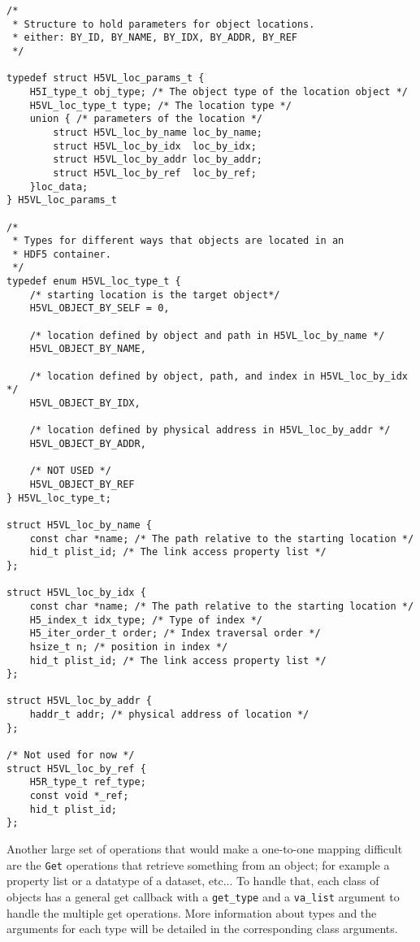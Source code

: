 \documentclass[10pt,a4paper]{article}
\begin{document}
\begin{lstlisting}
/* 
 * Structure to hold parameters for object locations.
 * either: BY_ID, BY_NAME, BY_IDX, BY_ADDR, BY_REF 
 */

typedef struct H5VL_loc_params_t {
    H5I_type_t obj_type; /* The object type of the location object */
    H5VL_loc_type_t type; /* The location type */
    union { /* parameters of the location */
        struct H5VL_loc_by_name loc_by_name;
        struct H5VL_loc_by_idx  loc_by_idx;
        struct H5VL_loc_by_addr loc_by_addr;
        struct H5VL_loc_by_ref  loc_by_ref;
    }loc_data;
} H5VL_loc_params_t

/* 
 * Types for different ways that objects are located in an 
 * HDF5 container.
 */
typedef enum H5VL_loc_type_t {
    /* starting location is the target object*/
    H5VL_OBJECT_BY_SELF = 0, 

    /* location defined by object and path in H5VL_loc_by_name */
    H5VL_OBJECT_BY_NAME, 

    /* location defined by object, path, and index in H5VL_loc_by_idx */
    H5VL_OBJECT_BY_IDX,

    /* location defined by physical address in H5VL_loc_by_addr */
    H5VL_OBJECT_BY_ADDR,

    /* NOT USED */
    H5VL_OBJECT_BY_REF
} H5VL_loc_type_t;

struct H5VL_loc_by_name {
    const char *name; /* The path relative to the starting location */
    hid_t plist_id; /* The link access property list */
};

struct H5VL_loc_by_idx {
    const char *name; /* The path relative to the starting location */
    H5_index_t idx_type; /* Type of index */
    H5_iter_order_t order; /* Index traversal order */
    hsize_t n; /* position in index */
    hid_t plist_id; /* The link access property list */
};

struct H5VL_loc_by_addr {
    haddr_t addr; /* physical address of location */
};

/* Not used for now */
struct H5VL_loc_by_ref {
    H5R_type_t ref_type;
    const void *_ref;
    hid_t plist_id;
};
\end{lstlisting}

Another large set of operations that would make a one-to-one mapping
difficult are the {\tt Get} operations that retrieve something from an
object; for example a property list or a datatype of a dataset,
etc... To handle that, each class of objects has a general get
callback with a {\tt get\_type} and a {\tt va\_list} argument to handle
the multiple get operations. More information about types and the
arguments for each type will be detailed in the corresponding class
arguments.
\end{document}

